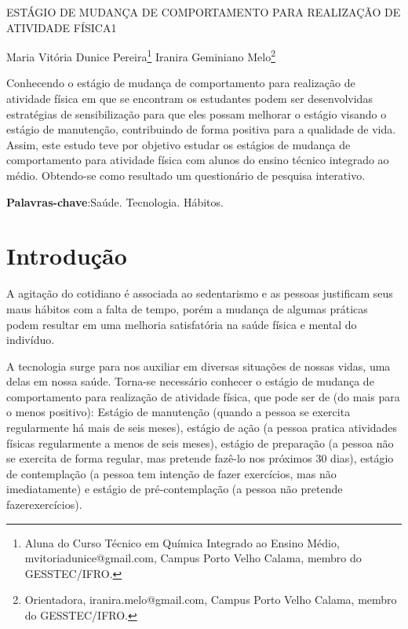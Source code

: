 \documentclass[article,12pt,onesidea,4paper,english,brazil]{abntex2}
\begin{document}
	
	
	\frenchspacing 
	
	\begin{center}
		\LARGE ESTÁGIO DE MUDANÇA DE COMPORTAMENTO PARA REALIZAÇÃO DE ATIVIDADE FÍSICA1
		
		\normalsize
		 Maria Vitória Dunice Pereira\footnote{Aluna do Curso Técnico em Química Integrado ao Ensino Médio, mvitoriadunice@gmail.com,
			Campus Porto Velho Calama, membro do GESSTEC/IFRO.
		} 
		Iranira Geminiano Melo\footnote{Orientadora, iranira.melo@gmail.com, Campus Porto Velho Calama, membro do GESSTEC/IFRO.} 
		
	\end{center}
	
	\begin{resumoumacoluna}
	Conhecendo o estágio de mudança de comportamento para realização de atividade física em que se encontram os estudantes podem ser desenvolvidas estratégias de sensibilização para que eles possam melhorar o estágio visando o estágio de manutenção, contribuindo de forma positiva para a qualidade de vida. Assim, este estudo teve por objetivo estudar os estágios de mudança de comportamento para atividade física com alunos do ensino técnico integrado ao médio. Obtendo-se como resultado um questionário de pesquisa interativo.
		
		\vspace{\onelineskip}
		
		\noindent
		\textbf{Palavras-chave}:Saúde. Tecnologia. Hábitos.
	\end{resumoumacoluna}
	
	\section*{Introdução}
	
	A agitação do cotidiano é associada ao sedentarismo e as pessoas justificam seus maus hábitos com a falta de tempo, porém a mudança de algumas práticas podem resultar em uma melhoria satisfatória na saúde física e mental do indivíduo.
	
	A tecnologia surge para nos auxiliar em diversas situações de nossas vidas, uma delas em nossa saúde. Torna-se necessário conhecer o estágio de mudança  de comportamento para realização de atividade física, que pode ser de (do mais para o menos positivo): Estágio de manutenção (quando a pessoa se exercita regularmente há mais de seis meses), estágio de ação (a pessoa pratica atividades físicas regularmente a menos de seis meses), estágio de preparação (a pessoa não se exercita de forma regular, mas pretende fazê-lo nos próximos 30 dias), estágio de contemplação (a pessoa tem intenção de fazer exercícios, mas não imediatamente) e estágio de pré-contemplação (a pessoa não pretende fazerexercícios).
	
\end{document}
